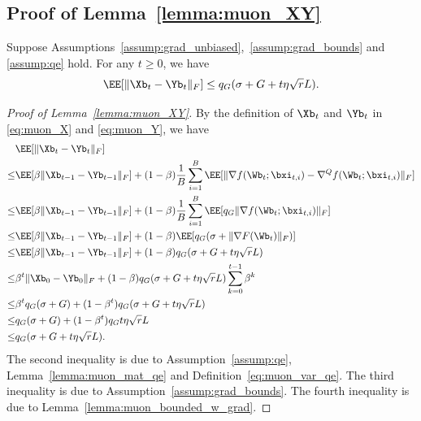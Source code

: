 \documentclass[11pt, letterpaper]{article}
\begin{document}
\subsection{Proof of Lemma~\ref{lemma:muon_XY}}
\begin{lemma}\label{lemma:muon_XY}
    Suppose Assumptions~\ref{assump:grad_unbiased},~\ref{assump:grad_bounds} and \ref{assump:qe} hold. For any $t\ge 0$, we have
    \begin{align*}
        \EE[\|\Xb_t - \Yb_t\|_F] \le q_G(\sigma + G + t\eta\sqrt{r}L).
    \end{align*}
\end{lemma}
\begin{proof}[Proof of Lemma~\ref{lemma:muon_XY}]
    By the definition of $\Xb_t$ and $\Yb_t$ in \eqref{eq:muon_X} and \eqref{eq:muon_Y}, we have
    \begin{align*}
        &\EE[\| \Xb_t - \Yb_t \|_F]\notag\\
        \le& \EE[\beta \| \Xb_{t-1} - \Yb_{t-1} \|_F] + (1-\beta)\frac{1}{B}\sum_{i=1}^B\EE[\| \nabla f(\Wb_t;\bxi_{t,i}) - \nabla^Q f(\Wb_t;\bxi_{t,i}) \|_F] \notag \\
        \le& \EE[\beta \| \Xb_{t-1} - \Yb_{t-1} \|_F] + (1-\beta)\frac{1}{B}\sum_{i=1}^B\EE[ q_G\| \nabla f(\Wb_t;\bxi_{t,i})  \|_F] \notag \\
        \le& \EE[\beta \| \Xb_{t-1} - \Yb_{t-1} \|_F] + (1-\beta)\EE[ q_G(\sigma + \| \nabla F(\Wb_t)  \|_F )] \notag \\
        \le& \EE[\beta \| \Xb_{t-1} - \Yb_{t-1} \|_F] + (1-\beta) q_G(\sigma + G + t\eta\sqrt{r}L ) \notag \\
        \le& \beta^t\|\Xb_0 - \Yb_0\|_F + (1-\beta) q_G(\sigma + G + t\eta\sqrt{r}L )\sum_{k=0}^{t-1}\beta^k \notag \\
        \le& \beta^t q_G(\sigma + G) + (1-\beta^t) q_G(\sigma + G + t\eta\sqrt{r}L ) \notag \\
        \le& q_G(\sigma + G) + (1-\beta^t)q_G t\eta\sqrt{r}L \notag \\
        \le& q_G(\sigma + G + t\eta\sqrt{r}L ).
    \end{align*}
    The second inequality is due to Assumption~\ref{assump:qe}, Lemma~\ref{lemma:muon_mat_qe} and Definition~\ref{eq:muon_var_qe}. The third inequality is due to Assumption~\ref{assump:grad_bounds}. The fourth inequality is due to Lemma~\ref{lemma:muon_bounded_w_grad}.
\end{proof}
\end{document}
